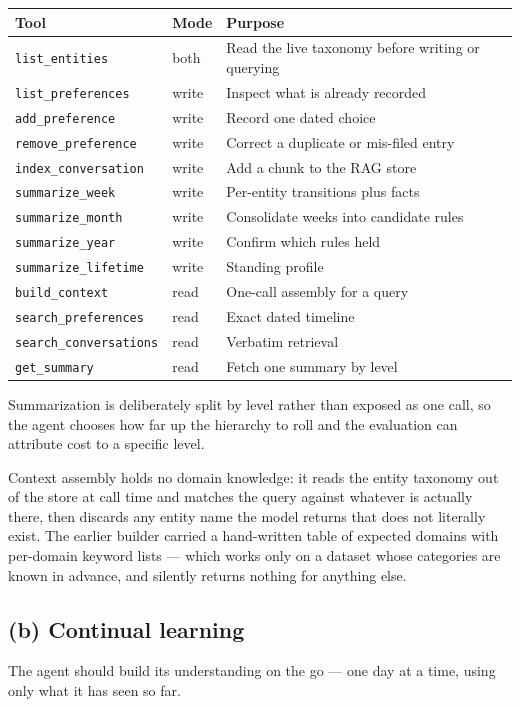 \documentclass[11pt]{article}
\begin{document}
\begin{table}[h]
\centering
\begin{tabularx}{\textwidth}{@{}l l L@{}}
\toprule
\textbf{Tool} & \textbf{Mode} & \textbf{Purpose} \\
\midrule
\texttt{list\_entities}        & both  & Read the live taxonomy before writing or querying \\
\texttt{list\_preferences}     & write & Inspect what is already recorded \\
\texttt{add\_preference}       & write & Record one dated choice \\
\texttt{remove\_preference}    & write & Correct a duplicate or mis-filed entry \\
\texttt{index\_conversation}   & write & Add a chunk to the RAG store \\
\texttt{summarize\_week}       & write & Per-entity transitions plus facts \\
\texttt{summarize\_month}      & write & Consolidate weeks into candidate rules \\
\texttt{summarize\_year}       & write & Confirm which rules held \\
\texttt{summarize\_lifetime}   & write & Standing profile \\
\texttt{build\_context}        & read  & One-call assembly for a query \\
\texttt{search\_preferences}   & read  & Exact dated timeline \\
\texttt{search\_conversations} & read  & Verbatim retrieval \\
\texttt{get\_summary}          & read  & Fetch one summary by level \\
\bottomrule
\end{tabularx}
\end{table}

Summarization is deliberately split by level rather than exposed as one call, so the
agent chooses how far up the hierarchy to roll and the evaluation can attribute cost to
a specific level.

Context assembly holds no domain knowledge: it reads the entity taxonomy out of the
store at call time and matches the query against whatever is actually there, then
discards any entity name the model returns that does not literally exist. The earlier
builder carried a hand-written table of expected domains with per-domain keyword lists
--- which works only on a dataset whose categories are known in advance, and silently
returns nothing for anything else.

\subsection{(b) Continual learning}

The agent should build its understanding on the go --- one day at a time, using only
what it has seen so far.
\end{document}
